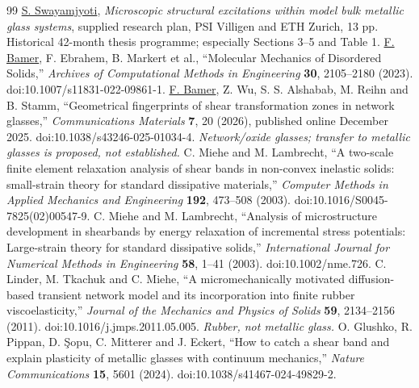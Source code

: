 \documentclass[11pt,a4paper]{article}
\begin{document}
\begin{thebibliography}{99}\small
{} \underline{S. Swayamjyoti}, \emph{Microscopic structural excitations within model bulk metallic glass systems}, supplied research plan, PSI Villigen and ETH Zurich, 13 pp. Historical 42-month thesis programme; especially Sections 3--5 and Table 1.
 \underline{F. Bamer}, F. Ebrahem, B. Markert et al., ``Molecular Mechanics of Disordered Solids,'' \emph{Archives of Computational Methods in Engineering} \textbf{30}, 2105--2180 (2023). doi:10.1007/s11831-022-09861-1.
 \underline{F. Bamer}, Z. Wu, S. S. Alshabab, M. Reihn and B. Stamm, ``Geometrical fingerprints of shear transformation zones in network glasses,'' \emph{Communications Materials} \textbf{7}, 20 (2026), published online December 2025. doi:10.1038/s43246-025-01034-4. \emph{Network/oxide glasses; transfer to metallic glasses is proposed, not established.}
 C. Miehe and M. Lambrecht, ``A two-scale finite element relaxation analysis of shear bands in non-convex inelastic solids: small-strain theory for standard dissipative materials,'' \emph{Computer Methods in Applied Mechanics and Engineering} \textbf{192}, 473--508 (2003). doi:10.1016/S0045-7825(02)00547-9.
 C. Miehe and M. Lambrecht, ``Analysis of microstructure development in shearbands by energy relaxation of incremental stress potentials: Large-strain theory for standard dissipative solids,'' \emph{International Journal for Numerical Methods in Engineering} \textbf{58}, 1--41 (2003). doi:10.1002/nme.726.
 C. Linder, M. Tkachuk and C. Miehe, ``A micromechanically motivated diffusion-based transient network model and its incorporation into finite rubber viscoelasticity,'' \emph{Journal of the Mechanics and Physics of Solids} \textbf{59}, 2134--2156 (2011). doi:10.1016/j.jmps.2011.05.005. \emph{Rubber, not metallic glass.}
 O. Glushko, R. Pippan, D. \c{S}opu, C. Mitterer and J. Eckert, ``How to catch a shear band and explain plasticity of metallic glasses with continuum mechanics,'' \emph{Nature Communications} \textbf{15}, 5601 (2024). doi:10.1038/s41467-024-49829-2.


\end{thebibliography}
\end{document}
